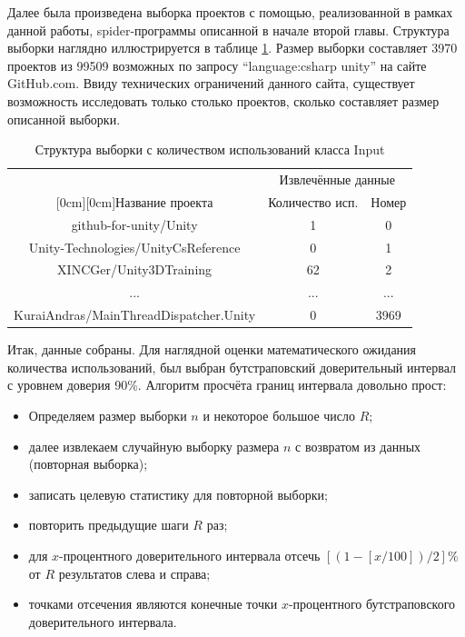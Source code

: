 Далее была произведена выборка проектов с помощью, реализованной в рамках данной работы, spider-программы описанной в начале второй главы. Структура выборки наглядно иллюстрируется в таблице \ref{tab:sample}. Размер выборки составляет 3970 проектов из 99509 возможных по запросу ``language:csharp unity'' на сайте GitHub.com. Ввиду технических ограничений данного сайта, существует возможность исследовать только столько проектов, сколько составляет размер описанной выборки.

\begin{table}[H]
	\caption{\label{tab:sample}Структура выборки с количеством использований класса Input}
	\begin{center}
		\begin{tabular}{|c|c|c|}
			\hline
			& \multicolumn{2}{c|}{Извлечённые данные} \\
			\cline{2-3}
			\raisebox{1.5ex}[0cm][0cm]{Название проекта}
			& Количество исп. & Номер \\
			\hline
			github-for-unity/Unity & 1 & 0 \\
			\hline
			Unity-Technologies/UnityCsReference & 0 & 1 \\
			\hline
			XINCGer/Unity3DTraining & 62 & 2 \\
			\hline
			... & ... & ... \\
			\hline
			KuraiAndras/MainThreadDispatcher.Unity & 0 & 3969 \\
			\hline
		\end{tabular}
	\end{center}
\end{table}

Итак, данные собраны. Для наглядной оценки математического ожидания количества использований, был выбран бутстраповский доверительный интервал \cite{oreilly} с уровнем доверия 90\%. Алгоритм просчёта границ интервала довольно прост:

\begin{itemize}
	\item Определяем размер выборки $n$ и некоторое большое число $R$;
	\item далее извлекаем случайную выборку размера $n$ с возвратом из данных (повторная выборка);
	\item записать целевую статистику для повторной выборки;
	\item повторить предыдущие шаги $R$ раз;
	\item для $x$-процентного доверительного интервала отсечь $\left[(1-\left[x / 100\right])/2\right]\%$ от $R$ результатов слева и справа;
	\item точками отсечения являются конечные точки $x$-процентного бутстраповского доверительного интервала.
\end{itemize}


